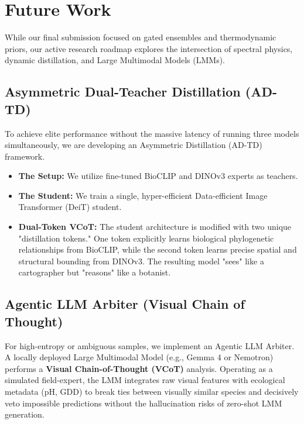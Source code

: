 \documentclass[10pt,twocolumn,letterpaper]{article}
\begin{document}
\section{Future Work}
While our final submission focused on gated ensembles and thermodynamic priors, our active research roadmap explores the intersection of spectral physics, dynamic distillation, and Large Multimodal Models (LMMs).

\subsection{Asymmetric Dual-Teacher Distillation (AD-TD)}
To achieve elite performance without the massive latency of running three models simultaneously, we are developing an Asymmetric Distillation (AD-TD) framework.
\begin{itemize}
    \item \textbf{The Setup:} We utilize fine-tuned BioCLIP and DINOv3 experts as teachers.
    \item \textbf{The Student:} We train a single, hyper-efficient Data-efficient Image Transformer (DeiT) student.
    \item \textbf{Dual-Token VCoT:} The student architecture is modified with two unique "distillation tokens." One token explicitly learns biological phylogenetic relationships from BioCLIP, while the second token learns precise spatial and structural bounding from DINOv3. The resulting model "sees" like a cartographer but "reasons" like a botanist.
\end{itemize}

\subsection{Agentic LLM Arbiter (Visual Chain of Thought)}
For high-entropy or ambiguous samples, we implement an Agentic LLM Arbiter. A locally deployed Large Multimodal Model (e.g., Gemma 4 or Nemotron) performs a \textbf{Visual Chain-of-Thought (VCoT)} analysis. Operating as a simulated field-expert, the LMM integrates raw visual features with ecological metadata (pH, GDD) to break ties between visually similar species and decisively veto impossible predictions without the hallucination risks of zero-shot LMM generation.
\end{document}
